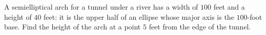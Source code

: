 A semielliptical arch for a tunnel under a river has a width of $100$ feet and a height of $40$ feet: it is the upper half of an ellipse whose major axis is the $100$-foot base. Find the height of the arch at a point $5$ feet from the edge of the tunnel.
